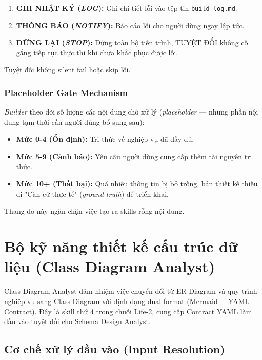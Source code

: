 \documentclass[13pt,a4paper,oneside]{extreport}
\numberwithin{equation}{chapter}
\numberwithin{figure}{chapter}
\numberwithin{table}{chapter}
\begin{document}
\begin{enumerate}
    \item \textbf{GHI NHẬT KÝ (\textit{LOG}):} Ghi chi tiết lỗi vào tệp tin \texttt{build-log.md}.
    \item \textbf{THÔNG BÁO (\textit{NOTIFY}):} Báo cáo lỗi cho người dùng ngay lập tức.
    \item \textbf{DỪNG LẠI (\textit{STOP}):} Dừng toàn bộ tiến trình, TUYỆT ĐỐI không cố gắng tiếp tục thực thi khi chưa khắc phục được lỗi.
\end{enumerate}

Tuyệt đối không silent fail hoặc skip lỗi.

\subsubsection{Placeholder Gate Mechanism}

\textit{Builder} theo dõi số lượng các nội dung chờ xử lý (\textit{placeholder} — những phần nội dung tạm thời cần người dùng bổ sung sau):

\begin{itemize}
    \item \textbf{Mức 0-4 (Ổn định):} Tri thức về nghiệp vụ đã đầy đủ.
    \item \textbf{Mức 5-9 (Cảnh báo):} Yêu cầu người dùng cung cấp thêm tài nguyên tri thức.
    \item \textbf{Mức 10+ (Thất bại):} Quá nhiều thông tin bị bỏ trống, bản thiết kế thiếu đi "Căn cứ thực tế" (\textit{ground truth}) để triển khai.
\end{itemize}

Thang đo này ngăn chặn việc tạo ra skills rỗng nội dung.

\section{Bộ kỹ năng thiết kế cấu trúc dữ liệu (Class Diagram Analyst)}

Class Diagram Analyst đảm nhiệm việc chuyển đổi từ ER Diagram và quy trình nghiệp vụ sang Class Diagram với định dạng dual-format (Mermaid + YAML Contract). Đây là skill thứ 4 trong chuỗi Life-2, cung cấp Contract YAML làm đầu vào tuyệt đối cho Schema Design Analyst.

\subsection{Cơ chế xử lý đầu vào (Input Resolution)}
\end{document}
